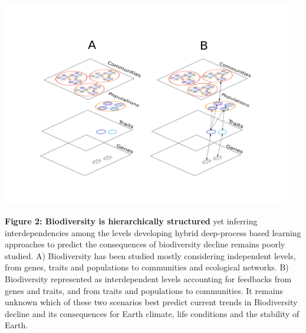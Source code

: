 \documentclass[authoryear,1p,12pt]{elsarticle}
\begin{document}
\begin{center}
  \vspace{-0.5 in}
        \hspace{-2 in}\includegraphics[width=0.95\textwidth]{Figure2.pdf}
     
     \vspace{-0.5 in}
     
     \caption{{\small {\bf Figure 2: Biodiversity is hierarchically
         structured} yet inferring interdependencies among the levels
       developing hybrid deep-process based learning approaches to
       predict the consequences of biodiversity decline remains poorly
       studied. A) Biodiversity has been studied mostly considering
       independent levels, from genes, traits and populations to
       communities and ecological networks. B) Biodiversity
       represented as interdependent levels accounting for feedbacks
       from genes and traits, and from traits and populations to
       communities. It remains unknown which of these two scenarios
       best predict current trends in Biodiversity decline and its
       consequences for Earth climate, life conditions and the
       stability of Earth.}}
     \end{center}
   
\end{document}

